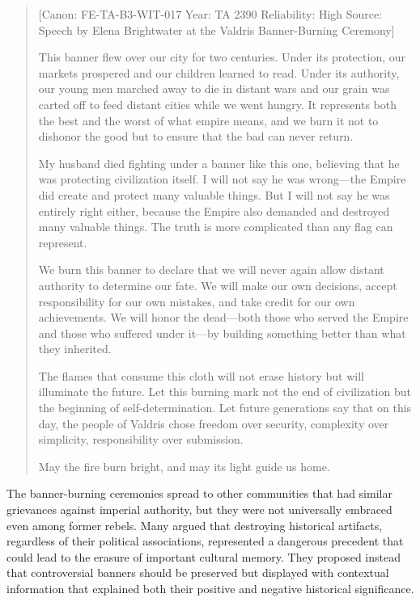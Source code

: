 \begin{quote}
{[}Canon: FE-TA-B3-WIT-017 \textbar{} Year: TA 2390 \textbar{}
Reliability: High \textbar{} Source: Speech by Elena Brightwater at the
Valdris Banner-Burning Ceremony{]}

This banner flew over our city for two centuries. Under its protection,
our markets prospered and our children learned to read. Under its
authority, our young men marched away to die in distant wars and our
grain was carted off to feed distant cities while we went hungry. It
represents both the best and the worst of what empire means, and we burn
it not to dishonor the good but to ensure that the bad can never return.

My husband died fighting under a banner like this one, believing that he
was protecting civilization itself. I will not say he was wrong---the
Empire did create and protect many valuable things. But I will not say
he was entirely right either, because the Empire also demanded and
destroyed many valuable things. The truth is more complicated than any
flag can represent.

We burn this banner to declare that we will never again allow distant
authority to determine our fate. We will make our own decisions, accept
responsibility for our own mistakes, and take credit for our own
achievements. We will honor the dead---both those who served the Empire
and those who suffered under it---by building something better than what
they inherited.

The flames that consume this cloth will not erase history but will
illuminate the future. Let this burning mark not the end of civilization
but the beginning of self-determination. Let future generations say that
on this day, the people of Valdris chose freedom over security,
complexity over simplicity, responsibility over submission.

May the fire burn bright, and may its light guide us home.
\end{quote}

The banner-burning ceremonies spread to other communities that had
similar grievances against imperial authority, but they were not
universally embraced even among former rebels. Many argued that
destroying historical artifacts, regardless of their political
associations, represented a dangerous precedent that could lead to the
erasure of important cultural memory. They proposed instead that
controversial banners should be preserved but displayed with contextual
information that explained both their positive and negative historical
significance.

